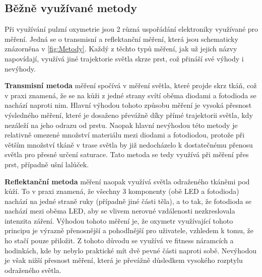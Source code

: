 \subsection {Běžně využívané metody}
Při využívání pulzní oxymetrie jsou 2 různá uspořádání elektroniky využívané pro měření. Jedná se o transmisní a reflektanční měření, která jsou schematicky znázorněna v \ref{fig:Metody}. Každý z těchto typů měření, jak už jejich názvy napovídají, využívá jiné trajektorie světla skrze prst, což přináší své výhody i nevýhody.
\par \textbf{Transmisní metoda} měření spočívá v měření světla, které projde skrz tkáň, což v praxi znamená, že se na kůži z jedné strany svítí oběma diodami a fotodioda se nachází naproti nim. Hlavní výhodou tohoto způsobu měření je vysoká přesnost výsledného měření, které je dosaženo převážně díky přímé trajektorii světla, kdy nezáleží na jeho odrazu od prstu. Naopak hlavní nevýhodou této metody je relativně omezené množství materiálu mezi diodami a fotodiodou, protože při větším množství tkáně v trase světla by již nedocházelo k dostatečnému přenosu světla pro přesné určení saturace. Tato metoda se tedy využívá při měření přes prst, případně ušní lalůček. %
\par \textbf{Reflektanční metoda} měření naopak využívá světla odraženého tkáněmi pod kůží. To v praxi znamená, že všechny 3 komponenty (obě LED a fotodioda) nachází na jedné straně ruky (případně jiné části těla), a to tak, že fotodioda se nachází mezi oběma LED, aby se vlivem nerovné vzdálenosti nezkreslovala intenzita záření. Výhodou tohoto měření je, že oxymetr využívající tohoto principu je výrazně přenosnější a pohodlnější pro uživatele, vzhledem k tomu, že ho stačí pouze přiložit. Z tohoto důvodu se využívá ve fitness náramcích a hodinkách, kde by nebylo praktické mít dvě pevné části naproti sobě. Nevýhodou je však nižší přesnost měření, která je převážně důsledkem vysokého rozptylu odraženého světla.